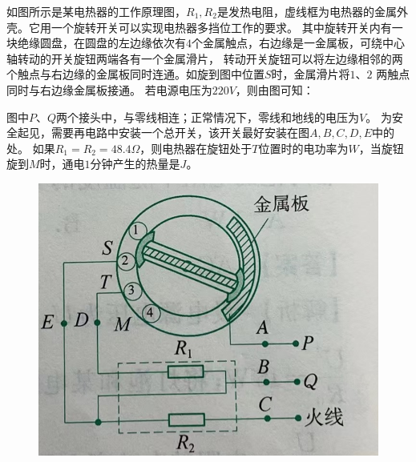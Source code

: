 \documentclass[a4paper,cs4size]{BHCexam}
\begin{document}
\begin{groups}
\begin{questions}[]
        \question[5] 如图所示是某电热器的工作原理图，$R_1, R_2$是发热电阻，虚线框为电热器的金属外壳。它用一个旋转开关可以实现电热器多挡位工作的要求。
        其中旋转开关内有一块绝缘圆盘，在圆盘的左边缘依次有$4$个金属触点，右边缘是一金属板，可绕中心轴转动的开关旋钮两端各有一个金属滑片，
        转动开关旋钮可以将左边缘相邻的两个触点与右边缘的金属板同时连通。如旋到图中位置$S$时，金属滑片将$1$、$2$ 两触点同时与右边缘金属板接通。
        若电源电压为$220V$，则由图可知：
        \begin{subquestions}
            \subquestion 图中$P$、$Q$两个接头中，\underline{\quad\quad\quad\quad}与零线相连；正常情况下，零线和地线的电压为\underline{\quad\quad\quad\quad}$V$。
            \subquestion 为安全起见，需要再电路中安装一个总开关，该开关最好安装在图$A,B,C,D,E$中的\underline{\quad\quad\quad\quad}处。
            \subquestion 如果$R_1=R_2=48.4\Omega$，则电热器在旋钮处于$T$位置时的电功率为\underline{\quad\quad\quad\quad}$W$，当旋钮
            旋到$M$时，通电$1$分钟产生的热量是\underline{\quad\quad\quad\quad}$J$。
        \end{subquestions}
        \begin{figure}[htb]
            \flushright
            \includegraphics [scale=0.4,trim=0 0 0 0]{./image/physics_circuit4_2.png}
            \label{fig:fig_circuit4_2}
        \end{figure}
        \vspace{3.5cm}


\end{questions}
\end{groups}
\end{document}
